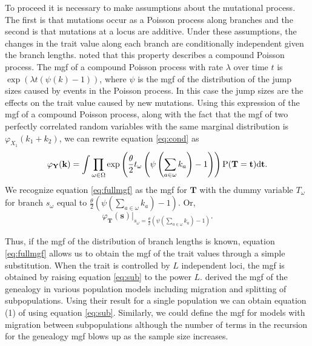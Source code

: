 To proceed it is necessary to make assumptions about the mutational process. The
first is that mutations occur as a Poisson process along branches and the second
is that mutations at a locus are additive. Under these assumptions, the changes
in the trait value along each branch are conditionally independent given the
branch lengths. \citet{Khaitovich2005} noted that this property describes a
compound Poisson process. The mgf of a compound Poisson process with rate
$\lambda$ over time $t$ is $\exp(\lambda t (\psi(k)-1))$, where $\psi$ is the
mgf of the distribution of the jump sizes caused by events in the Poisson
process. In this case the jump sizes are the effects on the trait value caused
by new mutations. Using this expression of the mgf of a compound Poisson
process, along with the fact that the mgf of two perfectly correlated random
variables with the same marginal distribution is $\varphi_{X_1}(k_1+k_2)$, we
can rewrite equation \eqref{eq:cond} as
\begin{equation}
  \label{eq:fullmgf}
  \varphi_{\mathbf{Y}}(\mathbf{k}) = 
  \int \prod_{\omega \in \Omega} \exp\left( \frac{\theta}{2} t_{\omega} \left( \psi\left(\sum_{a \in \omega}k_{a}\right) -1 \right)\right)
  \mathrm{P}(\mathbf{T}=\mathbf{t})\mbox{d}\mathbf{t}.
\end{equation}
We recognize equation \eqref{eq:fullmgf} as the mgf for $\mathbf{T}$ with the
dummy variable $T_{\omega}$ for branch $s_\omega$ equal to
$\frac{\theta}{2} \left( \psi(\sum_{a \in \omega}k_{a}) -1 \right)$. Or,
\begin{equation}
  \label{eq:sub}
  \varphi_{\mathbf{T}}(\mathbf{s})\Bigr|_{s_{\omega}=\frac{\theta}{2} \left( \psi\left(\sum_{a \in \omega}k_{a}\right) -1 \right)}.
\end{equation}

Thus, if the mgf of the distribution of branch lengths is known, equation
\eqref{eq:fullmgf} allows us to obtain the mgf of the trait values through a
simple substitution. When the trait is controlled by $L$ independent loci, the
mgf is obtained by raising equation \eqref{eq:sub} to the power $L$.
\citet{Lohse2011} derived the mgf of the genealogy in various population models
including migration and splitting of subpopulations. Using their result for a
single population we can obtain equation (1) of \citet{Schraiber2015} using
equation \eqref{eq:sub}. Similarly, we could define the mgf for models with
migration between subpopulations although the number of terms in the recursion
for the genealogy mgf blows up as the sample size increases.

